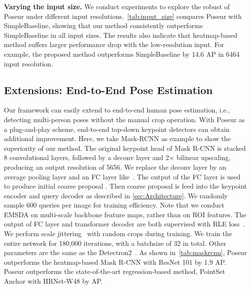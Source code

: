 \documentclass[runningheads]{llncs}
\def\ie{{i.e.\xspace}}
\def\handle{{Poseur}\xspace}
\begin{document}
\noindent\textbf{Varying the input size.} We conduct experiments to explore the robust of \handle under different input resolutions.~\cref{tab:input_size} compares \handle with SimpleBaseline, showing that our method consistently outperforms SimpleBaseline in all input sizes.
The results also indicate that heatmap-based method suffers larger performance drop with the low-resolution input. For example, the proposed method outperforms SimpleBaseline by 14.6 AP in 6464 input resolution. 









\subsection{Extensions: End-to-End Pose Estimation}
Our framework can easily extend to end-to-end human pose estimation, \ie, detecting multi-person poses without the manual crop operation. With \handle as a plug-and-play scheme, end-to-end top-down keypoint detectors can obtain additional improvement. Here, we take Mask-RCNN as example to show the superiority of our method. The original keypoint head of Mask R-CNN is stacked 8 convolutional layers, followed by a deconv layer and 2× bilinear upscaling, producing an output resolution of 5656. We replace the deconv layer by an average pooling layer and an FC layer like~\cite{li2021rle}. The output of the FC layer is used to produce initial coarse proposal . Then coarse proposal  is feed into the keypoint encoder and query decoder as described in \cref{sec:Architecture}. We randomly sample 600 queries per image for training efficiency. Note that we conduct EMSDA on multi-scale backbone feature maps, rather than on ROI features. The output of FC layer and transformer decoder are both supervised with RLE loss~\cite{li2021rle}.
We perform scale jittering~\cite{ghiasi2021simple} with random crops during training.
We train the entire network for 180,000 iterations, with a batchsize of 32 in total. Other parameters are the same as the Detectron2~\cite{wu2019detectron2}.
As shown in~\cref{tab:maskrcnn}, \handle outperforms the heatmap-based Mask R-CNN with ResNet 101 by 1.9 AP. \handle outperforms the state-of-the-art regression-based method, PointSet Anchor with HRNet-W48 by  AP.
\end{document}
